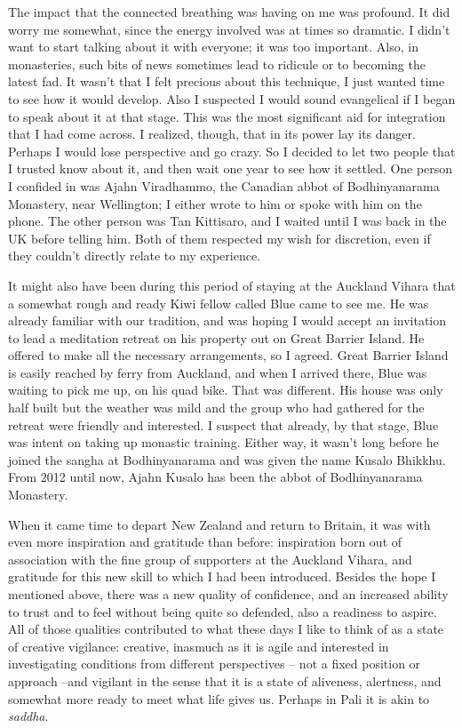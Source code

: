 The impact that the connected breathing was having on me was profound.
It did worry me somewhat, since the energy involved was at times so
dramatic. I didn't want to start talking about it with everyone; it was
too important. Also, in monasteries, such bits of news sometimes lead to
ridicule or to becoming the latest fad. It wasn't that I felt precious
about this technique, I just wanted time to see how it would develop.
Also I suspected I would sound evangelical if I began to speak about it
at that stage. This was the most significant aid for integration that I
had come across. I realized, though, that in its power lay its danger.
Perhaps I would lose perspective and go crazy. So I decided to let two
people that I trusted know about it, and then wait one year to see how
it settled. One person I confided in was Ajahn Viradhammo, the Canadian
abbot of Bodhinyanarama Monastery, near Wellington; I either wrote to
him or spoke with him on the phone. The other person was Tan Kittisaro,
and I waited until I was back in the UK before telling him. Both of them
respected my wish for discretion, even if they couldn't directly relate
to my experience.

It might also have been during this period of staying at the Auckland
Vihara that a somewhat rough and ready Kiwi fellow called Blue came to
see me. He was already familiar with our tradition, and was hoping I
would accept an invitation to lead a meditation retreat on his property
out on Great Barrier Island. He offered to make all the necessary
arrangements, so I agreed. Great Barrier Island is easily reached by
ferry from Auckland, and when I arrived there, Blue was waiting to pick
me up, on his quad bike. That was different. His house was only half
built but the weather was mild and the group who had gathered for the
retreat were friendly and interested. I suspect that already, by that
stage, Blue was intent on taking up monastic training. Either way, it
wasn't long before he joined the sangha at Bodhinyanarama and was given
the name Kusalo Bhikkhu. From 2012 until now, Ajahn Kusalo has been the
abbot of Bodhinyanarama Monastery.

When it came time to depart New Zealand and return to Britain, it was
with even more inspiration and gratitude than before: inspiration born
out of association with the fine group of supporters at the Auckland
Vihara, and gratitude for this new skill to which I had been introduced.
Besides the hope I mentioned above, there was a new quality of
confidence, and an increased ability to trust and to feel without being
quite so defended, also a readiness to aspire. All of those qualities
contributed to what these days I like to think of as a state of creative
vigilance: creative, inasmuch as it is agile and interested in
investigating conditions from different perspectives -- not a fixed
position or approach --and vigilant in the sense that it is a state of
aliveness, alertness, and somewhat more ready to meet what life gives
us. Perhaps in Pali it is akin to \emph{saddha}.

